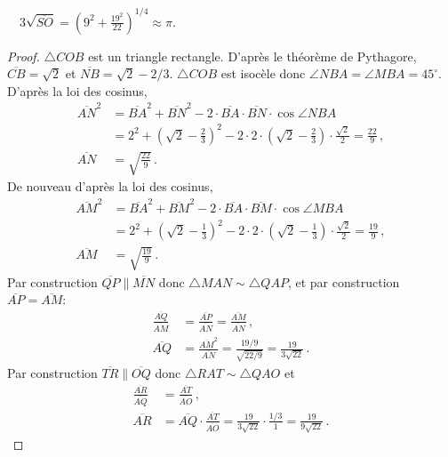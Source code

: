\begin{theorem}\label{thm.ramanujan2}
$\quad 3\sqrt{\overline{SO}}=\left(9^2+\displaystyle\frac{19^2}{22}\right)^{1/4}\approx \pi$.
\end{theorem}
\begin{proof}
$\triangle COB$ est un triangle rectangle. D'après le théorème de Pythagore,  $\overline{CB}=\sqrt{2}$ et 
$\overline{NB}=\sqrt{2}-2/3$. 
$\triangle COB$ est isocèle donc 
 $\angle NBA =\angle MBA=45^\circ$. D'après la loi des cosinus,
\begin{align*}
\overline{AN}^2&=\overline{BA}^2 + \overline{BN}^2-2\cdot\overline{BA}\cdot\overline{BN}\cdot\cos \angle NBA\\
&=2^2+\left(\sqrt{2}-\frac{2}{3}\right)^2-2\cdot 2 \cdot \left(\sqrt{2}-\frac{2}{3}\right)\cdot \frac{\sqrt{2}}{2}
=\frac{22}{9}\,,\\
\overline{AN}&=\sqrt{\frac{22}{9}}\,.
\end{align*}
De nouveau d'après la loi des cosinus,
\begin{align*}
\overline{AM}^2&=\overline{BA}^2 + \overline{BM}^2-2\cdot\overline{BA}\cdot\overline{BM}\cdot\cos \angle MBA\\
&=2^2+\left(\sqrt{2}-\frac{1}{3}\right)^2-2\cdot 2 \cdot \left(\sqrt{2}-\frac{1}{3}\right)\cdot \frac{\sqrt{2}}{2}
=\frac{19}{9}\,,\\
\overline{AM}&=\sqrt{\frac{19}{9}}\,.
\end{align*}
Par construction $\overline{QP}\parallel  \overline{MN}$ donc 
$\triangle MAN\sim \triangle QAP$, et par  construction $\overline{AP}=\overline{AM}$:
\begin{align*}
\frac{\overline{AQ}}{\overline{AM}}&=\frac{\overline{AP}}{\overline{AN}}=\frac{\overline{AM}}{\overline{AN}}\,,\\
\overline{AQ}&=\frac{\overline{AM}^2}{\overline{AN}}=\frac{19/9}{\sqrt{22/9}}=\frac{19}{3\sqrt{22}}\,.
\end{align*}
Par construction $\overline{TR}\parallel  \overline{OQ}$ donc 
$\triangle RAT\sim \triangle QAO$  et 
\begin{align*}
\frac{\overline{AR}}{\overline{AQ}}&=\frac{\overline{AT}}{\overline{AO}}\,,\\
\overline{AR}&=\overline{AQ}\cdot\frac{\overline{AT}}{\overline{AO}}=\frac{19}{3\sqrt{22}}\cdot\frac{1/3}{1}=\frac{19}{9\sqrt{22}}\,.
\end{align*}

\end{proof}
